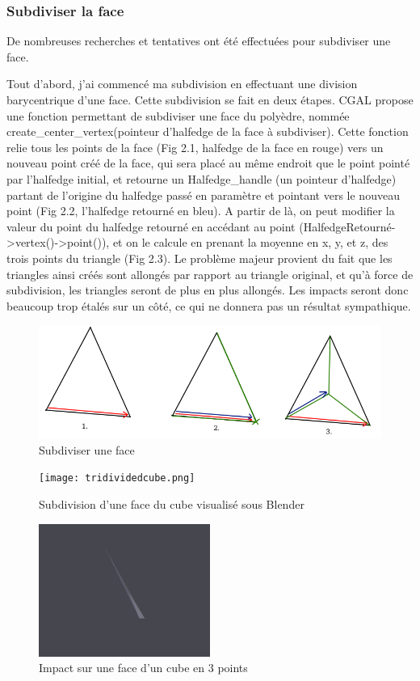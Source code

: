 \documentclass[a4paper,french]{report}
\begin{document}
				\subsubsection{Subdiviser la face}
					De nombreuses recherches et tentatives ont été effectuées pour subdiviser une face. \par
					Tout d'abord, j'ai commencé ma subdivision en effectuant une division barycentrique d'une face. Cette subdivision se fait en deux étapes. CGAL propose une fonction permettant de subdiviser une face du polyèdre, nommée create\_center\_vertex(pointeur d'halfedge de la face à subdiviser). Cette fonction relie tous les points de la face (Fig 2.1, halfedge de la face en rouge) vers un nouveau point créé de la face, qui sera placé au même endroit que le point pointé par l'halfedge initial, et retourne un Halfedge\_handle (un pointeur d'halfedge) partant de l'origine du halfedge passé en paramètre et pointant vers le nouveau point (Fig 2.2, l'halfedge retourné en bleu). A partir de là, on peut modifier la valeur du point du halfedge retourné en accédant au point (HalfedgeRetourné-\textgreater vertex()-\textgreater point()), et on le calcule en prenant la moyenne en x, y, et z, des trois points du triangle (Fig 2.3). Le problème majeur provient du fait que les triangles ainsi créés sont allongés par rapport au triangle original, et qu'à force de subdivision, les triangles seront de plus en plus allongés. Les impacts seront donc beaucoup trop étalés sur un côté, ce qui ne donnera pas un résultat sympathique. \par 
					\begin{figure}[h]
						\centering
						\includegraphics[width=1\textwidth]{FigBarycentricMesh.png}
						\caption{Subdiviser une face}
					\end{figure}
					\begin{figure}[h]
						\centering
						\texttt{[image: tridividedcube.png]}
						\caption{Subdivision d'une face du cube visualisé sous Blender}
					\end{figure}
					\begin{figure}[h]
						\centering
						\includegraphics[width=0.5\textwidth]{impact1.png}
						\caption{Impact sur une face d'un cube en 3 points}
					\end{figure}
\end{document}
